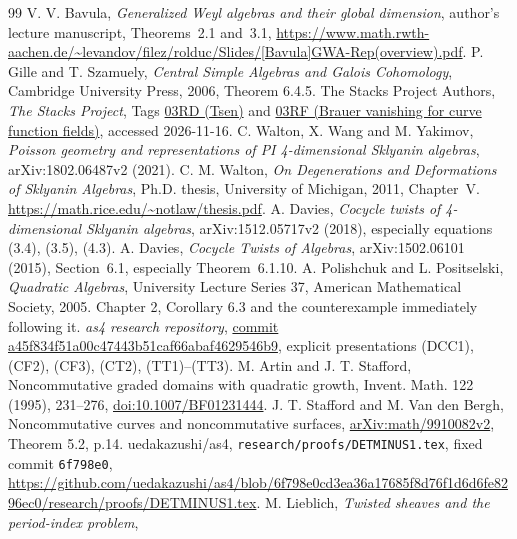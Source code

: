 \documentclass[11pt,a4paper]{ltjsarticle}
\theoremstyle{definition}\newtheorem{definition}[theorem]{定義}
\begin{document}
\begin{thebibliography}{99}
V. V. Bavula, \emph{Generalized Weyl algebras and their global dimension},
author's lecture manuscript, Theorems~2.1 and~3.1,
\url{https://www.math.rwth-aachen.de/~levandov/filez/rolduc/Slides/[Bavula]GWA-Rep(overview).pdf}.
 P. Gille and T. Szamuely,
\emph{Central Simple Algebras and Galois Cohomology},
Cambridge University Press, 2006, Theorem 6.4.5.
 The Stacks Project Authors,
\emph{The Stacks Project}, Tags
\href{https://stacks.math.columbia.edu/tag/03RD}{03RD (Tsen)} and
\href{https://stacks.math.columbia.edu/tag/03RF}{03RF (Brauer vanishing for curve function fields)},
accessed 2026-11-16.
C. Walton, X. Wang and M. Yakimov,
\emph{Poisson geometry and representations of PI 4-dimensional Sklyanin algebras},
arXiv:1802.06487v2 (2021).
C. M. Walton, \emph{On Degenerations and Deformations of Sklyanin Algebras},
Ph.D. thesis, University of Michigan, 2011, Chapter~V.
\url{https://math.rice.edu/~notlaw/thesis.pdf}.
A. Davies, \emph{Cocycle twists of 4-dimensional Sklyanin algebras},
arXiv:1512.05717v2 (2018), especially equations (3.4), (3.5), (4.3).
A. Davies, \emph{Cocycle Twists of Algebras},
arXiv:1502.06101 (2015), Section~6.1, especially Theorem~6.1.10.
A. Polishchuk and L. Positselski, \emph{Quadratic Algebras},
University Lecture Series 37, American Mathematical Society, 2005.
Chapter 2, Corollary 6.3 and the counterexample immediately following it.
 \emph{as4 research repository},
\href{https://github.com/uedakazushi/as4/tree/a45f834f51a00c47443b51caf66abaf4629546b9}{commit a45f834f51a00c47443b51caf66abaf4629546b9},
explicit presentations (DCC1), (CF2), (CF3), (CT2), (TT1)--(TT3).
M. Artin and J. T. Stafford,
Noncommutative graded domains with quadratic growth,
Invent. Math. 122 (1995), 231--276,
\href{https://doi.org/10.1007/BF01231444}{doi:10.1007/BF01231444}.
J. T. Stafford and M. Van den Bergh,
Noncommutative curves and noncommutative surfaces,
\href{https://arxiv.org/abs/math/9910082v2}{arXiv:math/9910082v2},
Theorem 5.2, p.14.
uedakazushi/as4, \texttt{research/proofs/DETMINUS1.tex},
fixed commit \texttt{6f798e0},
\url{https://github.com/uedakazushi/as4/blob/6f798e0cd3ea36a17685f8d76f1d6d6fe8296ec0/research/proofs/DETMINUS1.tex}.
 M. Lieblich,
\emph{Twisted sheaves and the period-index problem},

\end{thebibliography}
\end{document}
